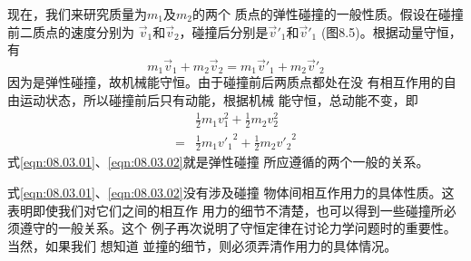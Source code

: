 现在，我们来研究质量为$ m _ { 1 } $及$ m _ { 2 } $的两个
质点的弹性碰撞的一般性质。假设在碰撞前二质点的速度分别为
$ \vec{ v } _ { 1 } $和$ \vec{ v } _ { 2 } $，碰撞后分别是$ \vec{ v } ' _ { 1 } $和$ \vec{ v } ' _ { 1 } $
(图8.5)。根据动量守恒，有
\begin{equation}\label{eqn:08.03.01}
  m _ { 1 } \vec{ v } _ { 1 } + m _ { 2 } \vec{ v } _ { 2 } = m _ { 1 } \vec{ v } ' _ { 1 } + m _ { 2 } \vec{ v } ' _ { 2 }
\end{equation}
因为是弹性碰撞，故机械能守恒。由于碰撞前后两质点都处在没
有相互作用的自由运动状态，所以碰撞前后只有动能，根据机械
能守恒，总动能不变，即
\begin{equation}\label{eqn:08.03.02}
  \begin{split}
    & \frac { 1 } { 2 } m _ { 1 } v _ { 1 } ^ { 2 } + \frac { 1 } { 2 } m _ { 2 } v _ { 2 } ^ { 2 } \\
    = & \frac { 1 } { 2 } m _ { 1 } { v ' _ { 1 } } ^ { 2 } + \frac { 1 } { 2 } m _ { 2 } { v ' _ { 2 } } ^ { 2 }
  \end{split}
\end{equation}
式\eqref{eqn:08.03.01}、\eqref{eqn:08.03.02}就是弹性碰撞
所应遵循的两个一般的关系。

式\eqref{eqn:08.03.01}、\eqref{eqn:08.03.02}没有涉及碰撞
物体间相互作用力的具体性质。这表明即使我们对它们之间的相互作
用力的细节不清楚，也可以得到一些碰撞所必须遵守的一般关系。这个
例子再次说明了守恒定律在讨论力学问题时的重要性。当然，如果我们
想知道
並撞的细节，则必须弄清作用力的具体情况。

